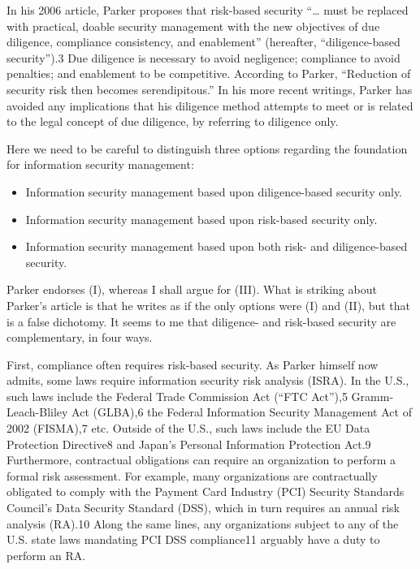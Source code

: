 In his 2006 article, Parker proposes that risk-based security ``\ldots{}
must be replaced with practical, doable security management with the new
objectives of due diligence, compliance consistency, and enablement''
(hereafter, ``diligence-based security'').3 Due diligence is necessary
to avoid negligence; compliance to avoid penalties; and enablement to be
competitive. According to Parker, ``Reduction of security risk then
becomes serendipitous.'' In his more recent writings, Parker has avoided
any implications that his diligence method attempts to meet or is
related to the legal concept of due diligence, by referring to diligence
only.

Here we need to be careful to distinguish three options regarding the
foundation for information security management:

\begin{itemize}
\itemsep1pt\parskip0pt
\item
  Information security management based upon diligence-based security
  only.
\item
  Information security management based upon risk-based security only.
\item
  Information security management based upon both risk- and
  diligence-based security.
\end{itemize}

Parker endorses (I), whereas I shall argue for (III). What is striking
about Parker's article is that he writes as if the only options were (I)
and (II), but that is a false dichotomy. It seems to me that diligence-
and risk-based security are complementary, in four ways.

First, compliance often requires risk-based security. As Parker himself
now admits, some laws require information security risk analysis (ISRA).
In the U.S., such laws include the Federal Trade Commission Act (``FTC
Act''),5 Gramm-Leach-Bliley Act (GLBA),6 the Federal Information
Security Management Act of 2002 (FISMA),7 etc. Outside of the U.S., such
laws include the EU Data Protection Directive8 and Japan's Personal
Information Protection Act.9 Furthermore, contractual obligations can
require an organization to perform a formal risk assessment. For
example, many organizations are contractually obligated to comply with
the Payment Card Industry (PCI) Security Standards Council's Data
Security Standard (DSS), which in turn requires an annual risk analysis
(RA).10 Along the same lines, any organizations subject to any of the
U.S. state laws mandating PCI DSS compliance11 arguably have a duty to
perform an RA.

